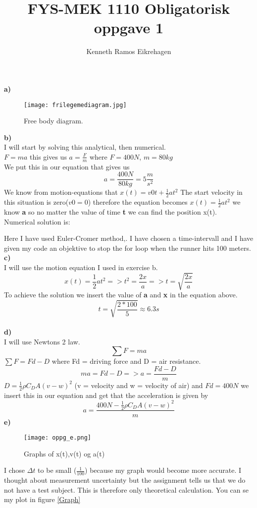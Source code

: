 \documentclass[,engelsk]{article}
\title{FYS-MEK 1110 Obligatorisk oppgave 1}
\author{Kenneth Ramos Eikrehagen}
\begin{document}
\maketitle
\tableofcontents

\textbf{a)}\\
\begin{figure}[h!]
\texttt{[image: frilegemediagram.jpg]} 
\caption{Free body diagram.}
\end{figure}

\textbf{b)}\\
I will start by solving this analytical, then numerical.\\
$F = ma$ this gives us $a =\frac{F}{m}$ where $F = 400N$, $m = 80kg$ \\
We put this in our equation that gives us $$a = \frac{400N}{80kg} = 5\frac{m}{s^2}$$ We know from motion-equations that $x(t) = v0t+\frac{1}{2}at^2$ The start velocity in this situation is zero($v0=0$) therefore the equation becomes $x(t) = \frac{1}{2}at^2$ we know \textbf{a} so no matter the value of time \textbf{t} we can find the position x(t). \\
Numerical solution is:

Here I have used Euler-Cromer method,. I have chosen a time-intervall and I have given my code an objektive to stop the for loop when the runner hits 100 meters.\\
\textbf{c)}\\
I will use the motion equation I used in exercise b. \\
$$x(t)=\frac{1}{2}at^2 => t^2=\frac{2x}{a} => t=\sqrt{\frac{2x}{a}}$$ To achieve the solution we insert the value of \textbf{a} and \textbf{x} in the equation above. $$ t=\sqrt{\frac{2*100}{5}}\approx 6.3s$$\\
\textbf{d)}\\
I will use Newtons 2 law. $$\sum F = ma$$
$\sum F = Fd - D$ where Fd = driving force and D = air resistance. 
$$ma = Fd-D => a = \frac{Fd-D}{m}$$
$D = \frac{1}{2}\rho C_{D}A(v-w)^2$ (v = velocity and w = velocity of air) and $Fd = 400N$ we insert this in our equation and get that the acceleration is given by 
$$a = \frac{ 400N - \frac{1}{2}\rho C_{D}A(v-w)^2}{m}$$
\textbf{e)}\\

\begin{figure}[h!]
\texttt{[image: oppg\_e.png]} 
\caption{Graphs of x(t),v(t) og a(t)}
\label{Graph}
\end{figure}
I chose $\Delta{t}$ to be small ($\frac{1}{100}$) because my graph would become more accurate. I thought about measurement uncertainty but the assignment tells us that we do not have a test subject. This is therefore only theoretical calculation. You can se my plot in figure \vref{Graph} \\
\end{document}
